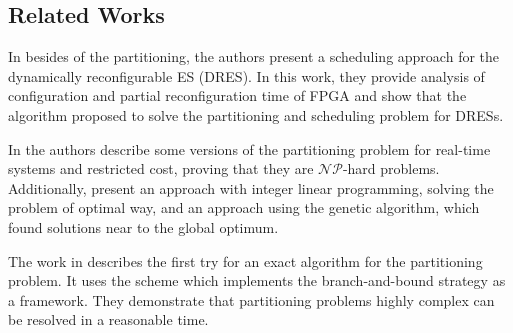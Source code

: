 \subsection{Related Works}  \label{chap:relacionados}
    
    In \cite{Mei2000} besides of the partitioning, the authors present a scheduling approach for the dynamically reconfigurable ES (DRES).
    In this work, they provide analysis of configuration and partial reconfiguration time of FPGA and show that the algorithm proposed to solve the partitioning and scheduling problem for DRESs.
    
    In \cite{Arato2003} the authors describe some versions of the partitioning problem for real-time systems and restricted cost, proving that they are $ \mathcal{NP} $-hard problems.
    Additionally, present an approach with integer linear programming, solving the problem of optimal way, and an approach using the genetic algorithm, which found solutions near to the global optimum.
    
    The work in \cite{Mann2007} describes the first try for an exact algorithm for the partitioning problem.
    It uses the scheme which implements the branch-and-bound strategy as a framework.
    They demonstrate that partitioning problems highly complex can be resolved in a reasonable time.
    
